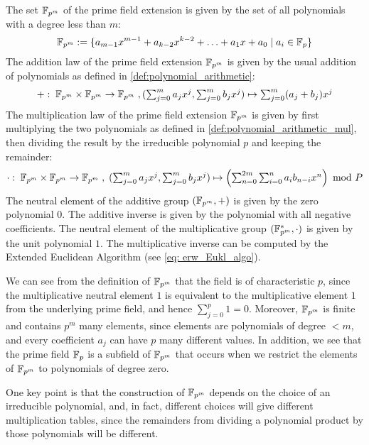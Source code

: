 The set $\mathbb{F}_{p^m}$ of the prime field extension is given by the set of all polynomials with a degree less than $m$:
\begin{equation}
\label{eq:prime-extension-field}
\mathbb{F}_{p^m}:= \{a_{m-1} x^{m-1}+a_{k-2}x^{k-2}+\ldots+a_1 x+a_0\;|\; a_i\in \mathbb{F}_p\}
\end{equation}
The addition law of the prime field extension $\mathbb{F}_{p^m}$ is given by the usual addition of polynomials as defined in \eqref{def:polynomial_arithmetic}: 
\begin{equation}
+:\; \mathbb{F}_{p^m}\times \mathbb{F}_{p^m} \to \mathbb{F}_{p^m}\; , \textstyle (\sum_{j=0}^m a_j x^j,\sum_{j=0}^m b_j x^j)\mapsto \sum_{j=0}^m (a_j+b_j) x^j
\end{equation}
The multiplication law of the prime field extension $\mathbb{F}_{p^m}$ is given by first multiplying the two polynomials as defined in \eqref{def:polynomial_arithmetic_mul},  then dividing the result by the irreducible polynomial $p$ and keeping the remainder:
\begin{equation}
\cdot : \; \mathbb{F}_{p^m}\times \mathbb{F}_{p^m} \to \mathbb{F}_{p^m}\; , \textstyle\; (\sum_{j=0}^m a_j x^j,\sum_{j=0}^m b_j x^j)\mapsto \left(\sum _{n = 0} ^{2m} \sum _{i = 0} ^{n}{a} _{i }{{b} _{n-i}}{x} ^{n}\right) \text{ mod } P
\end{equation}
The neutral element of the additive group $(\mathbb{F}_{p^m},+)$ is given by the zero polynomial $0$. The additive inverse is given by the polynomial with all negative coefficients. The neutral element of the multiplicative group $(\mathbb{F}^*_{p^m},\cdot)$ is given by the unit polynomial $1$. The multiplicative inverse can be computed by the Extended Euclidean Algorithm (see \ref{eq: erw_Eukl_algo}).

We can see from the definition of $\mathbb{F}_{p^m}$ that the field is of characteristic $p$, since the multiplicative neutral element $1$ is equivalent to the multiplicative element $1$ from the underlying prime field, and hence $\sum_{j=0}^p 1=0$. Moreover, $\mathbb{F}_{p^m}$ is finite and contains $p^m$ many elements, since elements are polynomials of degree $<m$, and every coefficient $a_j$ can have $p$ many different values. In addition, we see that the prime field $\mathbb{F}_p$ is a subfield of $\mathbb{F}_{p^m}$ that occurs when we restrict the elements of $\mathbb{F}_{p^m}$ to polynomials of degree zero.

One key point is that the construction of $\mathbb{F}_{p^m}$ depends on the choice of an irreducible polynomial, and, in fact, different choices will give different multiplication tables, since the remainders from dividing a polynomial product by those polynomials will be different.

